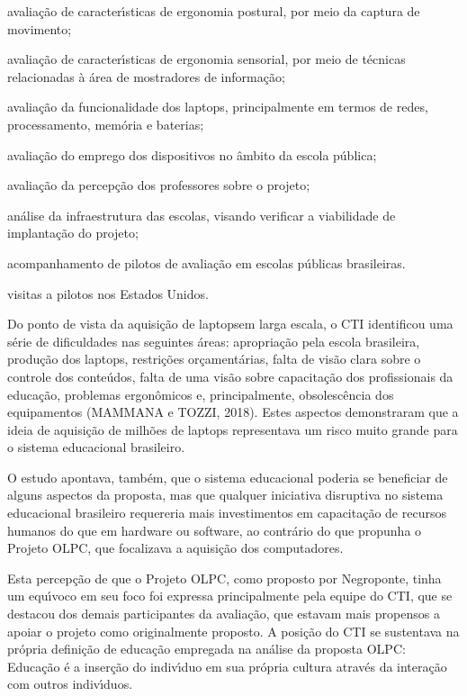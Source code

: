 \documentclass[
12pt,		%
openright,	%
twoside,  %
a4paper,			%
chapter=TITLE,		%
english,			%
french,				%
spanish,			%
brazil				%
]{USPSC-classe/USPSC}
\begin{document}
\begin{alineas}
\item avalia\c{c}\~ao de caracter\'{\i}sticas de ergonomia postural, por meio da captura de movimento;
\item avalia\c{c}\~ao de caracter\'{\i}sticas de ergonomia sensorial, por meio de t\'ecnicas relacionadas \`a \'area de mostradores de informa\c{c}\~ao;
\item avalia\c{c}\~ao da funcionalidade dos \textquotedbl laptops, principalmente em termos de redes, processamento, mem\'oria e baterias;
\item avalia\c{c}\~ao do emprego dos dispositivos no \^ambito da escola p\'ublica;
\item avalia\c{c}\~ao da percep\c{c}\~ao dos professores sobre o projeto;
\item an\'alise da infraestrutura das escolas, visando verificar a viabilidade de implanta\c{c}\~ao do projeto;
\item acompanhamento de pilotos de avalia\c{c}\~ao em escolas p\'ublicas brasileiras.
\item visitas a pilotos nos Estados Unidos.
\end{alineas}

Do ponto de vista da aquisi\c{c}\~ao de \textquotedbl laptops\textquotedbl  em larga escala, o CTI identificou uma s\'erie de dificuldades nas seguintes \'areas: apropria\c{c}\~ao pela escola brasileira, produ\c{c}\~ao dos laptops, restri\c{c}\~oes or\c{c}ament\'arias, falta de vis\~ao clara sobre o controle dos conte\'udos, falta de uma vis\~ao sobre capacita\c{c}\~ao dos profissionais da educa\c{c}\~ao, problemas ergon\^omicos e, principalmente, obsolesc\^encia dos equipamentos  (MAMMANA e TOZZI, 2018). Estes aspectos demonstraram que a ideia de aquisi\c{c}\~ao de milh\~oes de laptops representava um risco muito grande para o sistema educacional brasileiro.




O estudo apontava, tamb\'em, que o sistema educacional poderia se beneficiar de alguns aspectos da proposta, mas que qualquer iniciativa disruptiva no sistema educacional brasileiro requereria mais investimentos em capacita\c{c}\~ao de recursos humanos do que em hardware ou software, ao contr\'ario do que propunha o Projeto OLPC, que focalizava a aquisi\c{c}\~ao dos computadores.




Esta percep\c{c}\~ao de que o Projeto OLPC, como proposto por Negroponte, tinha um equ\'{\i}voco em seu foco foi expressa principalmente pela equipe do CTI, que se destacou dos demais participantes da avalia\c{c}\~ao, que estavam mais propensos a apoiar o projeto como originalmente proposto. A posi\c{c}\~ao do CTI se sustentava na pr\'opria defini\c{c}\~ao de educa\c{c}\~ao empregada na an\'alise da proposta OLPC: \textquotedbl Educa\c{c}\~ao \'e a inser\c{c}\~ao do indiv\'{\i}duo em sua pr\'opria cultura atrav\'es da intera\c{c}\~ao com outros indiv\'{\i}duos\textquotedbl .
\end{document}
